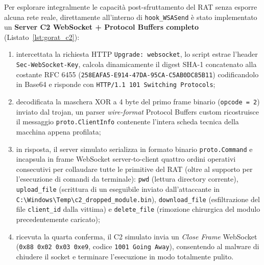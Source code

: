 \documentclass[11pt, a4paper]{article}
\begin{document}
Per esplorare integralmente le capacit\`a post-sfruttamento del RAT senza esporre alcuna rete reale, direttamente all'interno di \texttt{hook\_\allowbreak{}WSA\allowbreak{}Send} \`e stato implementato un \textbf{Server C2 WebSocket + Protocol Buffers completo} (Listato~\ref{lst:gorat_c2}):
\begin{enumerate}
	\item intercettata la richiesta HTTP \texttt{Upgrade: websocket}, lo script estrae l'header \texttt{Sec-\allowbreak{}Web\allowbreak{}Socket-\allowbreak{}Key}, calcola dinamicamente il digest SHA-1 concatenato alla costante RFC 6455 (\texttt{258EAFA5-\allowbreak{}E914-\allowbreak{}47DA-\allowbreak{}95CA-\allowbreak{}C5AB0DC85B11}) codificandolo in Base64 e risponde con \texttt{HTTP/\allowbreak{}1.1 101 Switching Protocols};
	\item decodificata la maschera XOR a 4 byte del primo frame binario (\texttt{opcode = 2}) inviato dal trojan, un parser \textit{wire-format} Protocol Buffers custom ricostruisce il messaggio \texttt{proto.\allowbreak{}Client\allowbreak{}Info} contenente l'intera scheda tecnica della macchina appena profilata;
	\item in risposta, il server simulato serializza in formato binario \texttt{proto.\allowbreak{}Command} e incapsula in frame WebSocket server-to-client quattro ordini operativi consecutivi per collaudare tutte le primitive del RAT (oltre al supporto per l'esecuzione di comandi da terminale): \texttt{pwd} (lettura directory corrente), \texttt{upload\_file} (scrittura di un eseguibile inviato dall'attaccante in \texttt{C:\textbackslash\allowbreak{}Windows\textbackslash\allowbreak{}Temp\textbackslash\allowbreak{}c2\_\allowbreak{}dropped\_\allowbreak{}module.\allowbreak{}bin}), \texttt{download\_\allowbreak{}file} (esfiltrazione del file \texttt{client\_id} dalla vittima) e \texttt{delete\_file} (rimozione chirurgica del modulo precedentemente caricato);
	\item ricevuta la quarta conferma, il C2 simulato invia un \textit{Close Frame} WebSocket (\texttt{0x88 0x02 0x03 0xe9}, codice \texttt{1001 Going Away}), consentendo al malware di chiudere il socket e terminare l'esecuzione in modo totalmente pulito.
\end{enumerate}
\end{document}
